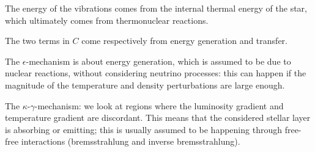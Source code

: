 \documentclass[main.tex]{subfiles}
\begin{document}
The energy of the vibrations comes from the internal thermal energy of the star, which ultimately comes from thermonuclear reactions.

The two terms in \(C\) come respectively from energy generation and transfer.

The \(\epsilon \)-mechanism is about energy generation, which is assumed to be due to nuclear reactions, without considering neutrino processes:
this can happen if the magnitude of the temperature and density perturbations are large enough.

The \(\kappa \)-\(\gamma \)-mechanism: we look at regions where the luminosity gradient and temperature gradient are discordant. This means that the considered stellar layer is absorbing or emitting; this is usually assumed to be happening through free-free interactions (bremsstrahlung and inverse bremsstrahlung).
\end{document}
